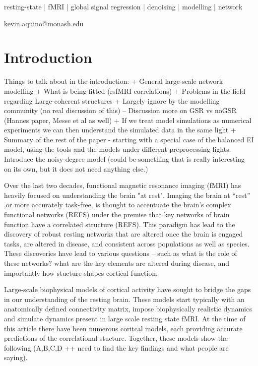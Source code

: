 \documentclass[oneside]{zHenriquesLab-StyleBioRxiv}
\begin{document}
\begin{keywords}
resting-state | fMRI | global signal regression | denoising | modelling | network
\end{keywords}

\begin{corrauthor}
kevin.aquino@monash.edu
\end{corrauthor}


\section*{Introduction}
Things to talk about in the introduction:
+ General large-scale network modelling
+ What is being fitted (rsfMRI correlations)
+ Problems in the field regarding Large-coherent structures
+ Largely ignore by the modelling community (no real discussion of this)
	-- Discussion more on GSR vs noGSR (Hannes paper, Messe et al as well)
+ If we treat model simulations as numerical experiments we can then understand the simulated data in the same light
+ Summary of the rest of the paper - starting with a special case of the balanced EI model, using the tools and the models under different preprocessing lights. Introduce the noisy-degree model (could be something that is really interesting on its own, but it does not need anything else.)


Over the last two decades, functional magnetic resonance imaging (fMRI) has heavily focused on understanding the brain "at rest". 
Imaging the brain at ``rest'' ,or more accurately task-free,   is thought to accentuate the brain's complex functional networks (REFS) under the premise that key networks of brain function have a correlated structure (REFS). 
This paradigm has lead to the discovery of robust resting networks that are altered once the brain is engaged tasks, are altered in disease, and consistent across populations as well as species. 
These discoveries have lead to various questions -- such as what is the role of these networks? what are the key elements are altered during disease, and importantly how stucture shapes cortical function.

Large-scale biophysical models of cortical activity have sought to bridge the gaps in our understanding of the resting brain. 
These models start typically with an anatomically defined connectivity matrix, impose biophysically realistic dynamics and simulate dynamics present in large scale resting state fMRI. 
At the time of this article there have been numerous coritcal models, each providing accurate predictions of the correlational stucture. 
Together, these models show the following (A,B,C,D ++ need to find the key findings and what people are saying).
\end{document}
